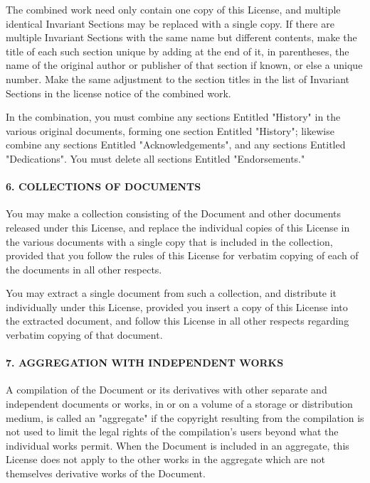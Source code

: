 \begin{multicols}{2}
{\footnotesize The combined work need only contain one copy of this License, and multiple identical Invariant Sections may be replaced with a single copy. If there are multiple Invariant Sections with the same name but different contents, make the title of each such section unique by adding at the end of it, in parentheses, the name of the original author or publisher of that section if known, or else a unique number. Make the same adjustment to the section titles in the list of Invariant Sections in the license notice of the combined work.}{\footnotesize \par}

{\footnotesize In the combination, you must combine any sections Entitled "History" in the various original documents, forming one section Entitled "History"; likewise combine any sections Entitled "Acknowledgements", and any sections Entitled "Dedications".  You must delete all sections Entitled "Endorsements."}{\footnotesize \par}


\paragraph{{\footnotesize 6. COLLECTIONS OF DOCUMENTS}}

{\footnotesize You may make a collection consisting of the Document and other documents released under this License, and replace the individual copies of this License in the various documents with a single copy that is included in the collection, provided that you follow the rules of this License for verbatim copying of each of the documents in all other respects.}{\footnotesize \par}

{\footnotesize You may extract a single document from such a collection, and distribute it individually under this License, provided you insert a copy of this License into the extracted document, and follow this License in all other respects regarding verbatim copying of that document.}{\footnotesize \par}


\paragraph{{\footnotesize 7. AGGREGATION WITH INDEPENDENT WORKS}}

{\footnotesize A compilation of the Document or its derivatives with other separate and independent documents or works, in or on a volume of a storage or distribution medium, is called an "aggregate" if the copyright resulting from the compilation is not used to limit the legal rights of the compilation's users beyond what the individual works permit. When the Document is included in an aggregate, this License does not apply to the other works in the aggregate which are not themselves derivative works of the Document.}{\footnotesize \par}


\end{multicols}

